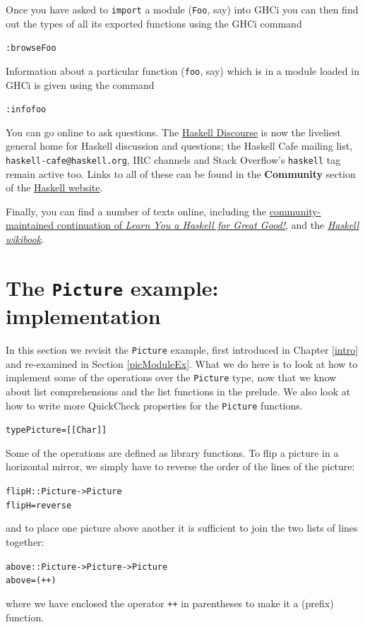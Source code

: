 \begin{description}
Once you have asked to \texttt{import} a module (\texttt{Foo}, say) into GHCi you can then find out the types of all its exported functions using the GHCi command
\begin{alltt}
:browse Foo
\end{alltt}
Information about a particular function (\texttt{foo}, say) which is in a module loaded in GHCi is given using the command
\begin{alltt} 
:info foo
\end{alltt}
\item[Online resources]
You can go online to ask questions. The \href{https://discourse.haskell.org}{Haskell Discourse} is now the liveliest general home for Haskell discussion and questions; the Haskell Cafe mailing list, \texttt{haskell-cafe@haskell.org}, IRC channels and Stack Overflow's \texttt{haskell} tag remain active too. Links to all of these can be found in the \textbf{Community} section of the \href{https://www.haskell.org}{Haskell website}.
\item[Online texts]
Finally, you can find a number of texts online, including the \href{https://learnyouahaskell.github.io/}{community-maintained continuation of \emph{Learn You a Haskell for Great Good!}}, and the \href{https://en.wikibooks.org/wiki/Haskell}{\emph{Haskell wikibook}}.
\end{description}






\section{The \texttt{Picture} example: implementation}
\label{picturesAgain}

In this section we revisit the \texttt{Picture} example, first
introduced in Chapter \ref{intro} and re-examined in Section
\ref{picModuleEx}. What we do here is to look at how to implement
some of the operations over the \texttt{Picture} type, now that we know about list comprehensions and the list functions in the prelude. We also look at how to write more QuickCheck properties for the \texttt{Picture} functions.
\begin{alltt}
type Picture = [[Char]]
\end{alltt}
Some of the operations are defined as library functions. To flip a
picture in a horizontal mirror, we simply have to reverse the order of
the lines of the picture:
\begin{alltt}
flipH :: Picture -> Picture
flipH = reverse
\end{alltt}
and to place one picture above another it is sufficient to join the two lists of
lines together:
\begin{alltt}
above :: Picture -> Picture -> Picture
above = (++)
\end{alltt}
where we have enclosed the operator \texttt{++} in parentheses to make it 
a (prefix) function.

